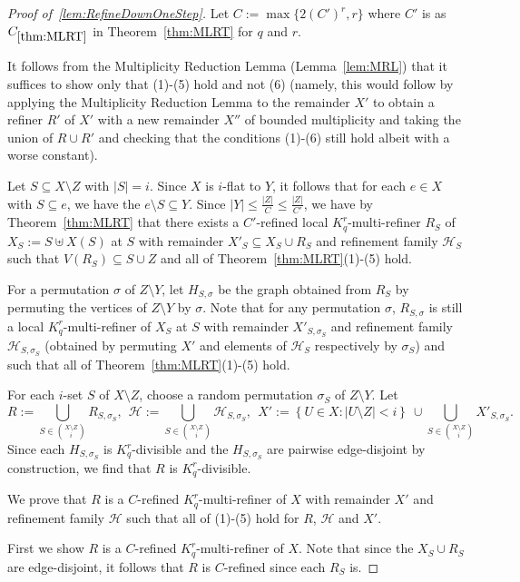 \documentclass[11pt]{article}
\newcounter{i}
\theoremstyle{plain}
\renewcommand{\theclaim}{\thetheorem.\arabic{claim}}
\newenvironment{lateproof}[1]
 {%
  \renewcommand{\theclaim}{\ref{#1}.\arabic{claim}}%
  \begin{proof}[Proof of~\cref{#1}]%
 }
 {\end{proof}}
\theoremstyle{plain} %
\theoremstyle{definition}
\begin{document}
\begin{lateproof}{lem:RefineDownOneStep}
Let $C:= \max\{2(C')^{r},r\}$ where $C'$ is as $C_{\ref{thm:MLRT}}$ in Theorem~\ref{thm:MLRT} for $q$ and $r$.

It follows from the Multiplicity Reduction Lemma (Lemma~\ref{lem:MRL}) that it suffices to show only that (1)-(5) hold and not (6) (namely, this would follow by applying the Multiplicity Reduction Lemma to the remainder $X'$ to obtain a refiner $R'$ of $X'$ with a new remainder $X''$ of bounded multiplicity and taking the union of $R\cup R'$ and checking that the conditions (1)-(6) still hold albeit with a worse constant).

Let $S \subseteq X\setminus Z$ with $|S|=i$. Since $X$ is $i$-flat to $Y$, it follows that for each $e\in X$ with $S\subseteq e$, we have the $e\setminus S \subseteq Y$. Since $|Y| \le \frac{|Z|}{C} \le \frac{|Z|}{C'}$, we have by Theorem~\ref{thm:MLRT} that there exists a $C'$-refined local $K_q^r$-multi-refiner $R_S$ of $X_S:= S\uplus X(S)$ at $S$ with remainder $X'_S\subseteq X_S\cup R_S$ and refinement family $\mathcal{H}_S$ such that $V(R_S)\subseteq S\cup Z$ and all of Theorem~\ref{thm:MLRT}(1)-(5) hold.  

For a permutation $\sigma$ of $Z\setminus Y$, let $H_{S,\sigma}$ be the graph obtained from $R_S$ by permuting the vertices of $Z\setminus Y$ by $\sigma$. Note that for any permutation $\sigma$, $R_{S,\sigma}$ is still a local $K_q^r$-multi-refiner of $X_S$ at $S$ with remainder $X'_{S,\sigma_S}$ and refinement family $\mathcal{H}_{S,\sigma_S}$ (obtained by permuting $X'$ and elements of $\mathcal{H}_S$ respectively by $\sigma_S$) and such that all of Theorem~\ref{thm:MLRT}(1)-(5) hold.

For each $i$-set $S$ of $X\setminus Z$, choose a random permutation $\sigma_S$ of $Z\setminus Y$. Let 
$$R:= \bigcup_{S\in \binom{X\setminus Z}{i}} R_{S,\sigma_S},~~\mathcal{H}:= \bigcup_{S\in \binom{X\setminus Z}{i}} \mathcal{H}_{S,\sigma_S}, ~~ X':= \left\{U\in X: |U\setminus Z| < i\right\}~\cup \bigcup_{S\in \binom{X\setminus Z}{i}} X'_{S,\sigma_S}.$$ 
Since each $H_{S,\sigma_S}$ is $K_q^r$-divisible and the $H_{S,\sigma_S}$ are pairwise edge-disjoint by construction, we find that $R$ is $K_q^r$-divisible.

We prove that $R$ is a $C$-refined $K_q^r$-multi-refiner of $X$ with remainder $X'$ and refinement family $\mathcal{H}$ such that all of (1)-(5) hold for $R$, $\mathcal{H}$ and $X'$.

First we show $R$ is a $C$-refined $K_q^r$-multi-refiner of $X$. Note that since the $X_S\cup R_S$ are edge-disjoint, it follows that $R$ is $C$-refined since each $R_S$ is.


\end{lateproof}
\end{document}
